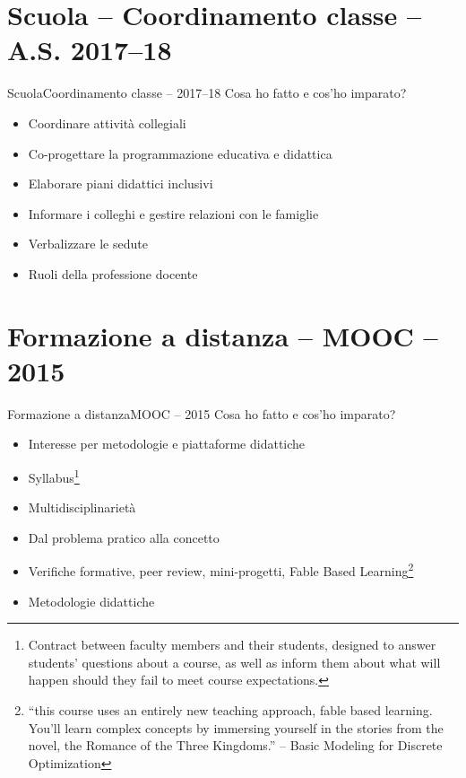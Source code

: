\documentclass[italian]{beamer}
\begin{document}
\section{Scuola -- Coordinamento classe -- A.S. 2017--18}

\begin{frame}{Scuola}{Coordinamento classe -- 2017--18}
 Cosa ho fatto e cos'ho imparato?
 \begin{itemize}
  \item Coordinare attivit\`a collegiali
  \item Co-progettare la programmazione educativa e didattica
  \item Elaborare piani didattici inclusivi
  \item Informare i colleghi e gestire relazioni con le famiglie
  \item Verbalizzare le sedute
  \item Ruoli della professione docente
 \end{itemize}
\end{frame}

\section{Formazione a distanza -- MOOC -- 2015}

\begin{frame}{Formazione a distanza}{MOOC -- 2015}
 Cosa ho fatto e cos'ho imparato?
 \begin{itemize}
  \item Interesse per metodologie e piattaforme didattiche
  \item Syllabus\footnote{Contract between faculty members and their students, designed to answer students' questions about a course, as well as inform them about what will happen should they fail to meet course expectations.}
  \item Multidisciplinariet\`a
  \item Dal problema pratico alla concetto
  \item Verifiche formative, peer review, mini-progetti, Fable Based Learning\footnote{``this course uses an entirely new teaching
 approach, fable based learning. You'll learn complex concepts by immersing yourself in the stories from the novel,
 the Romance of the Three Kingdoms.'' -- Basic Modeling for Discrete Optimization }
  \item Metodologie didattiche
 \end{itemize}
\end{frame}
\end{document}
